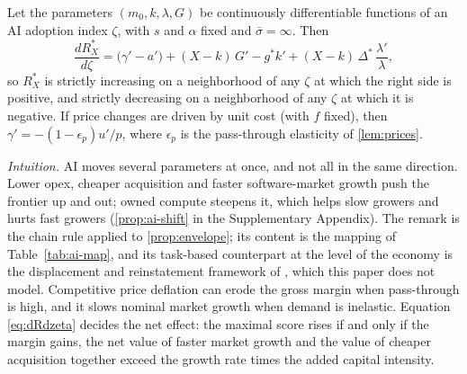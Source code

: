 \begin{remark}\label{prop:ai}
Let the parameters $(m_0,k,\lambda,G)$ be continuously differentiable functions of an AI adoption index $\zeta$, with $s$ and $\alpha$ fixed and $\bar\sigma=\infty$. Then
\begin{equation}\label{eq:dRdzeta}
\frac{dR_X^*}{d\zeta}=\bigl(\gamma'-a'\bigr)+(X-k)\,G'-g^*k'+(X-k)\,\Delta^*\,\frac{\lambda'}{\lambda},
\end{equation}
so $R_X^*$ is strictly increasing on a neighborhood of any $\zeta$ at which the right side is positive, and strictly decreasing on a neighborhood of any $\zeta$ at which it is negative. If price changes are driven by unit cost (with $f$ fixed), then $\gamma'=-(1-\epsilon_p)u'/p$, where $\epsilon_p$ is the pass-through elasticity of \autoref{lem:prices}.
\end{remark}

\noindent\emph{Intuition.} AI moves several parameters at once, and not all in the same direction. Lower opex, cheaper acquisition and faster software-market growth push the frontier up and out; owned compute steepens it, which helps slow growers and hurts fast growers (\autoref{prop:ai-shift} in the Supplementary Appendix). The remark is the chain rule applied to \autoref{prop:envelope}; its content is the mapping of Table~\ref{tab:ai-map}, and its task-based counterpart at the level of the economy is the displacement and reinstatement framework of \citet{acemoglu2018race}, which this paper does not model. Competitive price deflation can erode the gross margin when pass-through is high, and it slows nominal market growth when demand is inelastic. Equation \eqref{eq:dRdzeta} decides the net effect: the maximal score rises if and only if the margin gains, the net value of faster market growth and the value of cheaper acquisition together exceed the growth rate times the added capital intensity.

